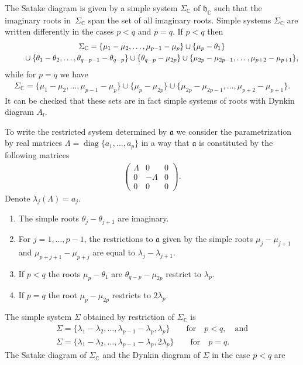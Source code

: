 \documentclass[pdftex]{sigma}
\numberwithin{equation}{section}
\begin{document}
The Satake diagram is given by a simple system $\Sigma _{\mathbb{C}}$ of $\mathfrak{h}_{\mathbb{C}}$ such that the imaginary roots in~$\Sigma _{\mathbb{C}}$ span the set of all imaginary roots. Simple systems $\Sigma _{\mathbb{C}}$ are written differently in the cases $p<q$ and $p=q$. If $p<q$ then
\begin{gather*}
\Sigma _{\mathbb{C}} = \{\mu _{1}-\mu _{2},\ldots,\mu _{p-1}-\mu _{p}\}\cup \{\mu _{p}-\theta _{1}\} \\
\hphantom{\Sigma _{\mathbb{C}} =}{} \cup \{\theta _{1}-\theta _{2},\ldots,\theta _{q-p-1}-\theta _{q-p}\}\cup \{\theta _{q-p}-\mu _{2p}\} \cup \{\mu _{2p}-\mu _{2p-1},\ldots,\mu _{p+2}-\mu _{p+1}\},
\end{gather*}
while for $p=q$ we have
\begin{gather*}
\Sigma _{\mathbb{C}}=\{\mu _{1}-\mu _{2},\ldots,\mu _{p-1}-\mu _{p}\}\cup \{\mu _{p}-\mu _{2p}\}\cup \{\mu _{2p}-\mu _{2p-1},\ldots,\mu _{p+2}-\mu_{p+1}\}.
\end{gather*}%
It can be checked that these sets are in fact simple systems of roots with Dynkin diagram $A_{l}$.

To write the restricted system determined by $\mathfrak{a}$ we consider the parametrization by real matrices $\Lambda =\operatorname{diag}\{a_{1},\ldots,a_{p}\}$ in a way that $\mathfrak{a }$ is constituted by the following
matrices
\begin{gather*}
\left(
\begin{matrix}
\Lambda & 0 & 0 \\
0 & -\Lambda & 0 \\
0 & 0 & 0%
\end{matrix}
\right).
\end{gather*}
Denote $\lambda_j(\Lambda)=a_j$.
\begin{enumerate}\itemsep=0pt
\item The simple roots $\theta _{j}-\theta _{j+1}$ are imaginary.
\item For $j=1,\ldots,p-1$, the restrictions to $\mathfrak{a}$ given by the simple roots $\mu _{j}-\mu _{j+1}$ and $\mu _{p+j+1}-\mu _{p+j}$ are equal to $\lambda _{j}-\lambda _{j+1}$.
\item If $p<q$ the roots $\mu _{p}-\theta _{1}$ are $\theta _{q-p}-\mu _{2p}$ restrict to $\lambda _{p}$.
\item If $p=q$ the root $\mu _{p}-\mu _{2p}$ restricts to $2\lambda _{p}$.
\end{enumerate}

The simple system $\Sigma $ obtained by restriction of $\Sigma _{\mathbb{C}}$ is
\begin{gather*}
\Sigma =\{\lambda _{1}-\lambda _{2},\ldots,\lambda _{p-1}-\lambda _{p},\lambda _{p}\}\qquad \text{for} \quad p<q, \quad \text{and}\\
\Sigma =\{\lambda _{1}-\lambda _{2},\ldots,\lambda _{p-1}-\lambda_{p},2\lambda _{p}\}\qquad \text{for} \quad p=q.
\end{gather*}
The Satake diagram of $\Sigma _{\mathbb{C}}$ and the Dynkin diagram of $\Sigma$ in the case $p<q$ are
\end{document}
